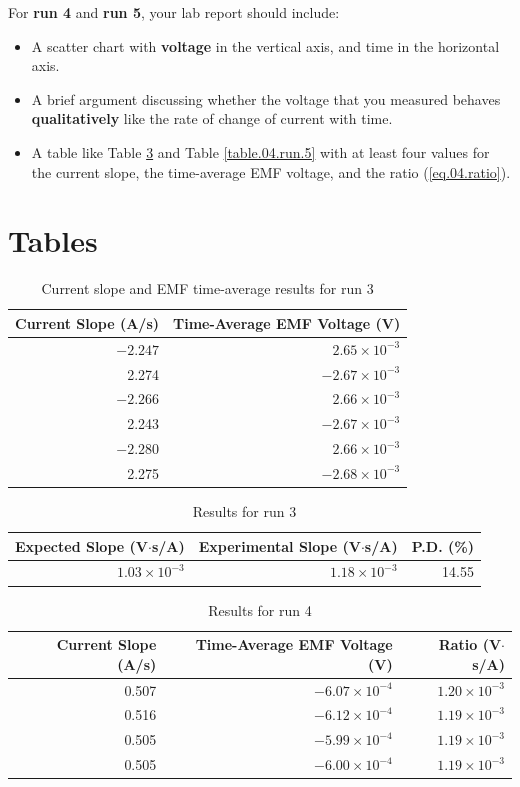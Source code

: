For \textbf{run 4} and \textbf{run 5}, your lab report should include:
\begin{itemize}
	\item A scatter chart with \textbf{voltage} in the vertical axis, and time in the horizontal axis.
	\item A brief argument discussing whether the voltage that you measured behaves \textbf{qualitatively} like the rate of change of current with time.
	\item A table like Table \ref{table.04.run.4} and Table \ref{table.04.run.5} with at least four values for the current slope, the time-average EMF voltage, and the ratio (\ref{eq.04.ratio}).
\end{itemize}
%
\newpage
\section{Tables}
%
\begin{table}[ht]
	\centering
	\begin{tabular}{|r|r|}
		\hline
		Current Slope (A/s) & Time-Average EMF Voltage (V) \\
		\hline
		$-2.247$ & $2.65 \times 10^{-3}$ \\
		2.274 & $-2.67 \times 10^{-3}$ \\
		$-2.266$ & $2.66 \times 10^{-3}$ \\
		2.243 & $-2.67 \times 10^{-3}$ \\
		$-2.280$ & $2.66 \times 10^{-3}$ \\
		2.275 & $-2.68 \times 10^{-3}$ \\
		\hline
	\end{tabular}
	\caption{Current slope and EMF time-average results for run 3}
	\label{table.04.run.3.I.V}
\end{table}
%
\begin{table}[ht]
	\centering
	\begin{tabular}{|r|r|r|}
		\hline
		Expected Slope (V$\cdot$s/A) & Experimental Slope (V$\cdot$s/A) & P.D. (\%) \\
		\hline
		$1.03 \times 10^{-3}$ & $1.18 \times 10^{-3}$ & 14.55 \\
		\hline
	\end{tabular}
	\caption{Results for run 3}
	\label{table.04.run.3}
\end{table}
%
\begin{table}[ht]
	\centering
	\begin{tabular}{|r|r|r|}
		\hline
		Current Slope (A/s) & Time-Average EMF Voltage (V) & Ratio (V$\cdot$s/A) \\
		\hline
		0.507 & $-6.07 \times 10^{-4}$ & $1.20 \times 10^{-3}$ \\
		0.516 & $-6.12 \times 10^{-4}$ & $1.19 \times 10^{-3}$ \\
		0.505 & $-5.99 \times 10^{-4}$ & $1.19 \times 10^{-3}$ \\
		0.505 & $-6.00 \times 10^{-4}$ & $1.19 \times 10^{-3}$ \\
		\hline
	\end{tabular}
	\caption{Results for run 4}
	\label{table.04.run.4}
\end{table}
